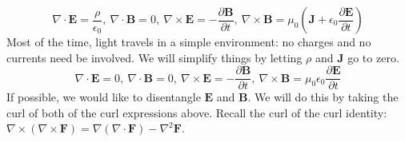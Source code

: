 \documentclass[]{article}
\begin{document}
\begin{equation}
\nabla \cdot \mathbf{E} = \frac{\rho}{\epsilon_0}, \ \nabla \cdot \mathbf{B} = 0, \ \nabla \times \mathbf{E} = - \frac{\partial \mathbf{B}}{\partial t}, \ \nabla \times \mathbf{B} = \mu_0 \left( \mathbf{J} + \epsilon_0 \frac{\partial \mathbf{E}}{\partial t} \right)
\end{equation}
Most of the time, light travels in a simple environment: no charges and no currents need be involved. We will simplify things by letting \(  \rho \) and \( \mathbf{J} \) go to zero.
\begin{equation}
\nabla \cdot \mathbf{E} = 0, \ \nabla \cdot \mathbf{B} = 0, \ \nabla \times \mathbf{E} = - \frac{\partial \mathbf{B}}{\partial t}, \ \nabla \times \mathbf{B} = \mu_0 \epsilon_0 \frac{\partial \mathbf{E}}{\partial t}
\end{equation}
If possible, we would like to disentangle \(\mathbf{E}\) and \( \mathbf{B} \). We will do this by taking the curl of both of the curl expressions above. Recall the curl of the curl identity: \(\nabla \times (\nabla \times \mathbf{F}) = \nabla (\nabla \cdot \mathbf{F}) - \nabla^2 \mathbf{F} \). 
\end{document}
